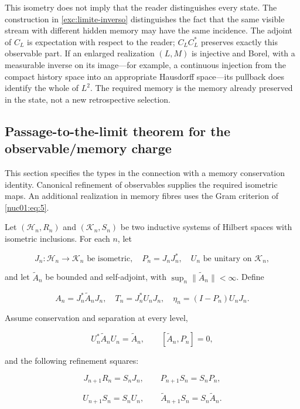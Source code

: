 This isometry does not imply that the reader distinguishes every state. The construction in \cref{exc:limite-inverso} distinguishes the fact that the same visible stream with different hidden memory may have the same incidence. The adjoint of \(C_L\) is expectation with respect to the reader; \(C_LC_L^*\) preserves exactly this observable part. If an enlarged realization \((L,M)\) is injective and Borel, with a measurable inverse on its image—for example, a continuous injection from the compact history space into an appropriate Hausdorff space—its pullback does identify the whole of \(L^2\). The required memory is the memory already preserved in the state, not a new retrospective selection.

\subsection{Passage-to-the-limit theorem for the observable/memory charge}

This section specifies the types in the connection with a memory conservation identity. Canonical refinement of observables supplies the required isometric maps. An additional realization in memory fibres uses the Gram criterion of \eqref{nuc01:eq:5}.

Let \((\mathscr H_n,R_n)\) and \((\mathscr K_n,S_n)\) be two inductive systems of Hilbert spaces with isometric inclusions. For each \(n\), let

\[
J_n:\mathscr H_n\to\mathscr K_n\text{ be isometric},\quad
P_n=J_nJ_n^*,\quad U_n\text{ be unitary on }\mathscr K_n,
\]

and let \(\widetilde A_n\) be bounded and self-adjoint, with \(\sup_n\|\widetilde A_n\|<\infty\). Define

\[
A_n=J_n^*\widetilde A_nJ_n,\quad
T_n=J_n^*U_nJ_n,\quad
\eta_n=(I-P_n)U_nJ_n.
\]

Assume conservation and separation at every level,

\begin{equation}
U_n^*\widetilde A_nU_n=\widetilde A_n,
\qquad [\widetilde A_n,P_n]=0,
\label{nuc01:eq:8}
\end{equation}

and the following refinement squares:

\begin{equation}
J_{n+1}R_n=S_nJ_n,\qquad
P_{n+1}S_n=S_nP_n,
\label{nuc01:eq:9}
\end{equation}

\begin{equation}
U_{n+1}S_n=S_nU_n,\qquad
\widetilde A_{n+1}S_n=S_n\widetilde A_n.
\label{nuc01:eq:10}
\end{equation}


